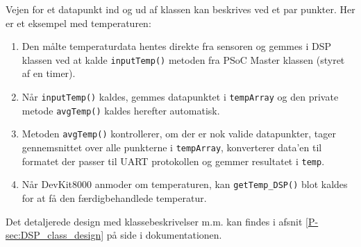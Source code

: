 Vejen for et datapunkt ind og ud af klassen kan beskrives ved et par punkter. Her er et eksempel med temperaturen:

\begin{enumerate}\itemsep1pt \parskip0pt 
\item Den målte temperaturdata hentes direkte fra sensoren og gemmes i DSP klassen ved at kalde \texttt{inputTemp()} metoden fra PSoC Master klassen (styret af en timer).

\item Når \texttt{inputTemp()} kaldes, gemmes datapunktet i \texttt{tempArray} og den private metode \texttt{avgTemp()} kaldes herefter automatisk.

\item Metoden \texttt{avgTemp()} kontrollerer, om der er nok valide datapunkter, tager gennemsnittet over alle punkterne i \texttt{tempArray}, konverterer data'en til formatet der passer til UART protokollen og gemmer resultatet i \texttt{temp}.

\item Når DevKit8000 anmoder om temperaturen, kan \texttt{getTemp\_DSP()} blot kaldes for at få den færdigbehandlede temperatur.

\end{enumerate}

Det detaljerede design med klassebeskrivelser m.m. kan findes i afsnit \ref{P-sec:DSP_class_design}  på side \pageref{P-sec:DSP_class_design} i dokumentationen.